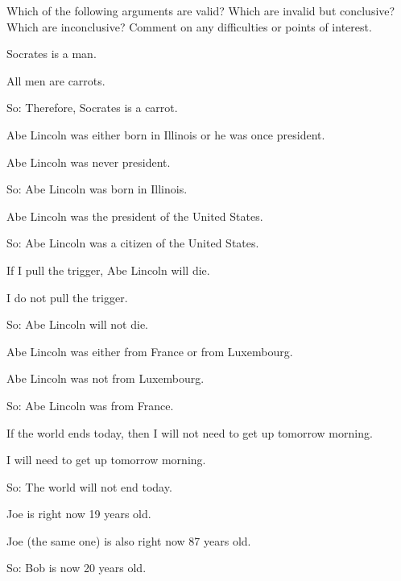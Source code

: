 \problempart
Which of the following arguments are valid? Which are invalid but conclusive? Which are inconclusive? Comment on any difficulties or points of interest.

\begin{earg}
\item Socrates is a man.
\item All men are carrots.
\item[So:] Therefore, Socrates is a carrot.
\end{earg}

\begin{earg}
\item Abe Lincoln was either born in Illinois or he was once president.
\item Abe Lincoln was never president.
\item[So:] Abe Lincoln was born in Illinois.
\end{earg}

\begin{earg}
\item Abe Lincoln was the president of the United States.
\item[So:] Abe Lincoln was a citizen of the United States.
\end{earg}

\begin{earg}
\item If I pull the trigger, Abe Lincoln will die.
\item I do not pull the trigger.
\item[So:] Abe Lincoln will not die.
\end{earg}

\begin{earg}
\item Abe Lincoln was either from France or from Luxembourg.
\item Abe Lincoln was not from Luxembourg.
\item[So:] Abe Lincoln was from France.
\end{earg}

\begin{earg}
\item If the world ends today, then I will not need to get up tomorrow morning.
\item I will need to get up tomorrow morning.
\item[So:] The world will not end today.
\end{earg}

\begin{earg}
\item Joe is right now 19 years old.
\item Joe (the same one) is also right now 87 years old.
\item[So:] Bob is now 20 years old.
\end{earg}

